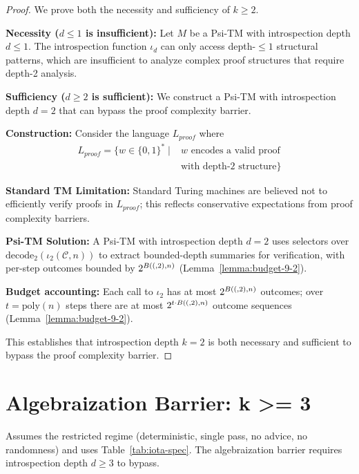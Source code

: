 \begin{proof}
We prove both the necessity and sufficiency of $k \geq 2$.

\textbf{Necessity ($d \le 1$ is insufficient):}
Let $M$ be a Psi-TM with introspection depth $d \leq 1$. The introspection function $\iota_d$ can only access depth-$\leq 1$ structural patterns, which are insufficient to analyze complex proof structures that require depth-2 analysis.

\textbf{Sufficiency ($d \ge 2$ is sufficient):}
We construct a Psi-TM with introspection depth $d = 2$ that can bypass the proof complexity barrier.

\textbf{Construction:}
Consider the language $L_{proof}$ where
\begin{align}
L_{proof} = \{w \in \{0,1\}^* \mid &\text{$w$ encodes a valid proof} \nonumber \\
&\text{with depth-2 structure}\}
\end{align}

\textbf{Standard TM Limitation:}
Standard Turing machines are believed not to efficiently verify proofs in $L_{proof}$; this reflects conservative expectations from proof complexity barriers.

\textbf{Psi-TM Solution:}
A Psi-TM with introspection depth $d = 2$ uses selectors over $\mathrm{decode}_2(\iota_2(\mathcal{C},n))$ to extract bounded-depth summaries for verification, with per-step outcomes bounded by $2^{B((,2),n)}$ (Lemma~\ref{lemma:budget-9-2}).

\textbf{Budget accounting:}
Each call to $\iota_2$ has at most $2^{B((,2),n)}$ outcomes; over $t=\mathrm{poly}(n)$ steps there are at most $2^{t\cdot B((,2),n)}$ outcome sequences (Lemma~\ref{lemma:budget-9-2}).

This establishes that introspection depth $k = 2$ is both necessary and sufficient to bypass the proof complexity barrier.
\end{proof}

\section{Algebraization Barrier: k >= 3}

\begin{theorem}
Assumes the restricted regime (deterministic, single pass, no advice, no randomness) and uses Table~\ref{tab:iota-spec}.
The algebraization barrier requires introspection depth $d \geq 3$ to bypass.
\end{theorem}

